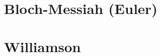 \documentclass[english,12pt]{shreyasnotes}
\begin{document}
\section{Bloch-Messiah (Euler) }

\section{Williamson}
\end{document}
